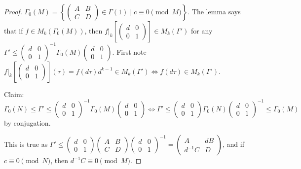 \documentclass{article}
\theoremstyle{definition}
\begin{document}
\begin{proof}
    $\Gamma_0(M)= \left\{\begin{pmatrix} A &B\\C& D \end{pmatrix} \in \Gamma(1) \mid c \equiv 0 \pmod{M}\right\}$. The lemma says that if $f \in M_k(\Gamma_0(M))$, then $f|_k\left[\begin{pmatrix} d&0\\0&1 \end{pmatrix}\right] \in M_k(\Gamma')$ for any $\Gamma' \le \begin{pmatrix} d &0\\0&1 \end{pmatrix}^{-1}\Gamma_0(M) \begin{pmatrix} d&0\\0&1 \end{pmatrix}$. First note $f|_k\left[\begin{pmatrix} d&0\\0&1 \end{pmatrix}\right](\tau) = f(d \tau) d^{k-1} \in M_k(\Gamma') \iff f(d \tau) \in M_k(\Gamma')$.
    \vspace{1mm}
     
    Claim: $\Gamma_0(N) \le  \Gamma' \le \begin{pmatrix} d &0\\0&1 \end{pmatrix}^{-1}\Gamma_0(M) \begin{pmatrix} d&0\\0&1 \end{pmatrix} \iff \Gamma' \le \begin{pmatrix} d &0\\0&1 \end{pmatrix}\Gamma_0(N) \begin{pmatrix} d&0\\0&1 \end{pmatrix}^{-1} \le \Gamma_0(M)$ by conjugation.
    \vspace{1mm}
     
    This is true as $\Gamma' \le \begin{pmatrix} d &0\\0&1 \end{pmatrix}\begin{pmatrix} A&B\\C&D \end{pmatrix} \begin{pmatrix} d&0\\0&1 \end{pmatrix}^{-1} = \begin{pmatrix} A&dB\\ d^{-1}C&D \end{pmatrix}$, and if $c \equiv 0 \pmod{N}$, then $d^{-1}C \equiv 0 \pmod{M}$.
\end{proof}
\end{document}
